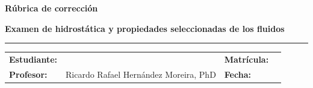 \documentclass[10pt]{article}
\begin{document}
\begin{center}
{\Large\bfseries\color{darkblue}Rúbrica de corrección}\par
{\normalsize\bfseries\color{darkblue}Examen de hidrostática y propiedades seleccionadas de los fluidos}\par
\vspace{0.06cm}
{\color{medblue}\rule{\linewidth}{1.3pt}}
\end{center}

\vspace{0.05cm}
\begin{tabularx}{\linewidth}{@{}>{\bfseries}l X >{\bfseries}l p{4.5cm}@{}}
Estudiante: & \hrulefill & Matrícula: & \hrulefill \\
Profesor: & Ricardo Rafael Hernández Moreira, PhD & Fecha: & \hrulefill
\end{tabularx}
\end{document}
